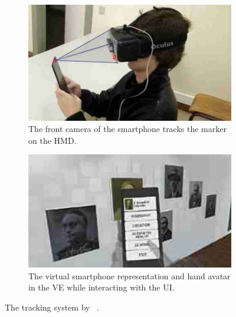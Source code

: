 \begin{figure}[H]
  \centering
  \begin{subfigure}[t]{0.4\textwidth}%
    \includegraphics[width=\textwidth]{figures/related_work/dias_2018_tracking.png}
    \caption{The front camera of the smartphone tracks the marker on the \ac{HMD}.}\label{fig:dias-2018-tracking}%
  \end{subfigure}%
  \hspace{0.1\textwidth}%
  \begin{subfigure}[t]{0.4\textwidth}%
    \includegraphics[width=\textwidth]{figures/related_work/dias_2018_virtual_smartphone.png}
    \caption{The virtual smartphone representation and hand avatar in the \ac{VE} while interacting with the \ac{UI}.}\label{fig:dias-2018-virtual-smartphone}
  \end{subfigure}%
  \caption[Tracking setup by Dias et al.]{The tracking system by \citeauthor{Dias.2018}~\protect\cite[4,5]{Dias.2018}.}\label{fig:dias-2018}
\end{figure}



